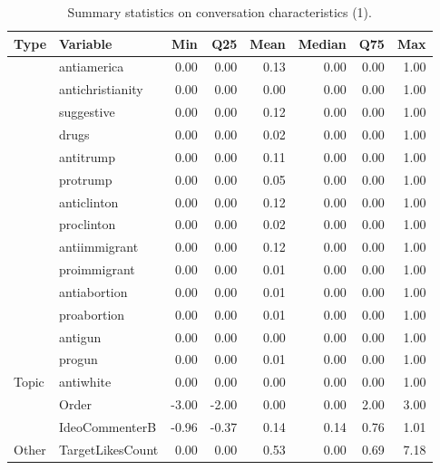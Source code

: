 \begin{table}[!h]
\centering
\caption{\label{tab:summ-tab2}Summary statistics on conversation characteristics (1).}
\centering
\begin{tabular}[t]{llrrrrrr}
\toprule
Type & Variable & Min & Q25 & Mean & Median & Q75 & Max\\
\midrule
 & antiamerica & 0.00 & 0.00 & 0.13 & 0.00 & 0.00 & 1.00\\
\cmidrule{2-8}
 & antichristianity & 0.00 & 0.00 & 0.00 & 0.00 & 0.00 & 1.00\\
\cmidrule{2-8}
 & suggestive & 0.00 & 0.00 & 0.12 & 0.00 & 0.00 & 1.00\\
\cmidrule{2-8}
 & drugs & 0.00 & 0.00 & 0.02 & 0.00 & 0.00 & 1.00\\
\cmidrule{2-8}
 & antitrump & 0.00 & 0.00 & 0.11 & 0.00 & 0.00 & 1.00\\
\cmidrule{2-8}
 & protrump & 0.00 & 0.00 & 0.05 & 0.00 & 0.00 & 1.00\\
\cmidrule{2-8}
 & anticlinton & 0.00 & 0.00 & 0.12 & 0.00 & 0.00 & 1.00\\
\cmidrule{2-8}
 & proclinton & 0.00 & 0.00 & 0.02 & 0.00 & 0.00 & 1.00\\
\cmidrule{2-8}
 & antiimmigrant & 0.00 & 0.00 & 0.12 & 0.00 & 0.00 & 1.00\\
\cmidrule{2-8}
 & proimmigrant & 0.00 & 0.00 & 0.01 & 0.00 & 0.00 & 1.00\\
\cmidrule{2-8}
 & antiabortion & 0.00 & 0.00 & 0.01 & 0.00 & 0.00 & 1.00\\
\cmidrule{2-8}
 & proabortion & 0.00 & 0.00 & 0.01 & 0.00 & 0.00 & 1.00\\
\cmidrule{2-8}
 & antigun & 0.00 & 0.00 & 0.00 & 0.00 & 0.00 & 1.00\\
\cmidrule{2-8}
 & progun & 0.00 & 0.00 & 0.01 & 0.00 & 0.00 & 1.00\\
\cmidrule{2-8}
\multirow{-15}{*}{\raggedright\arraybackslash Topic} & antiwhite & 0.00 & 0.00 & 0.00 & 0.00 & 0.00 & 1.00\\
\cmidrule{1-8}
 & Order & -3.00 & -2.00 & 0.00 & 0.00 & 2.00 & 3.00\\
\cmidrule{2-8}
 & IdeoCommenterB & -0.96 & -0.37 & 0.14 & 0.14 & 0.76 & 1.01\\
\cmidrule{2-8}
\multirow{-3}{*}{\raggedright\arraybackslash Other} & TargetLikesCount & 0.00 & 0.00 & 0.53 & 0.00 & 0.69 & 7.18\\
\bottomrule
\end{tabular}
\end{table}
